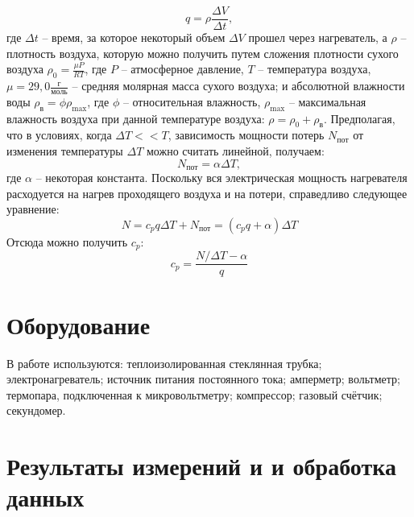 \documentclass[a4paper,11pt]{article}
\begin{document}
\begin{equation}    \label{eq4}
q = \rho \frac{\Delta V}{\Delta t},
\end{equation}
где $\Delta t$ -- время, за которое некоторый объем $\Delta V$ прошел через нагреватель, а $\rho$ -- плотность воздуха, которую можно получить путем сложения плотности сухого воздуха $\rho _{0} = \frac{\mu P}{RT}$, где $P$ -- атмосферное давление, $T$ -- температура воздуха, $\mu = 29,0 \frac{г}{моль}$ -- средняя молярная масса сухого воздуха; и абсолютной влажности воды $\rho _{в} = \phi \rho _{\max}$, где $\phi$ -- относительная влажность, $\rho _{\max}$ -- максимальная влажность воздуха при данной температуре воздуха: $\rho = \rho _{0} + \rho _{в}$.\newline
Предполагая, что в условиях, когда $\Delta T << T$, зависимость мощности потерь $N_{пот}$ от изменения температуры $\Delta T$ можно считать линейной, получаем:\newline
\begin{equation}    \label{eq5}
N_{пот} = \alpha \Delta T,
\end{equation}
где $\alpha$ -- некоторая константа.\newline
Поскольку вся электрическая мощность нагревателя расходуется на нагрев проходящего воздуха и на потери, справедливо следующее уравнение:\newline
\begin{equation}    \label{eq6}
N = c_{p}q \Delta T + N_{пот} = (c_{p}q +\alpha) \Delta T
\end{equation}
Отсюда можно получить $c_{p}$:
\begin{equation}    \label{eq7}
c_{p} = \frac{N / \Delta T - \alpha}{q}
\end{equation}
\section{Оборудование}
В работе используются: теплоизолированная стеклянная трубка; электронагреватель; источник питания постоянного тока; амперметр; вольтметр; термопара, подключенная к микровольтметру; компрессор; газовый счётчик; секундомер.\newline
\section{Результаты измерений и и обработка данных}
\end{document}
